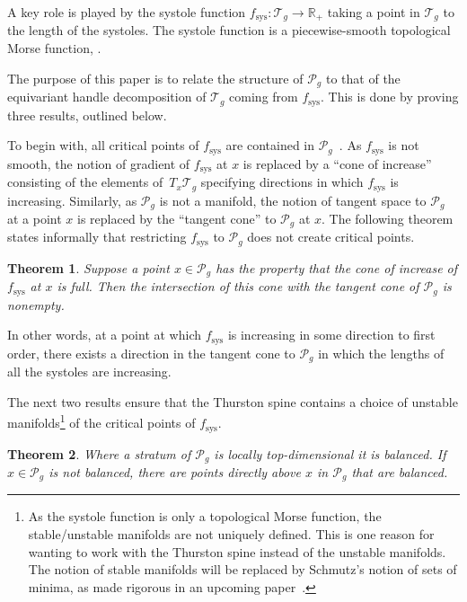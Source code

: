\documentclass[pdftex]{sigma}
\numberwithin{equation}{section}
\newtheorem{Theorem}{Theorem}[section]
\begin{document}
A key role is played by the systole function $f_{\mathrm{sys}}\colon \mathcal{T}_{g}\rightarrow \mathbb{R}_{+}$ taking a point in $\mathcal{T}_{g}$ to the length of the systoles. The systole function is a piecewise-smooth topological Morse function, \cite{Akrout,SchmutzMorse}.

The purpose of this paper is to relate the structure of $\mathcal{P}_{g}$ to that of the equivariant handle decomposition of $\mathcal{T}_{g}$ coming from $f_{\mathrm{sys}}$. This is done by proving three results, outlined below.

To begin with, all critical points of $f_{\mathrm{sys}}$ are contained in $\mathcal{P}_{g}$~\cite{Thurston}. As $f_{\mathrm{sys}}$ is not smooth, the notion of gradient of $f_{\mathrm{sys}}$ at $x$ is replaced by a ``cone of increase'' consisting of the elements of~$T_{x}\mathcal{T}_{g}$ specifying directions in which $f_{\mathrm{sys}}$ is increasing. Similarly, as $\mathcal{P}_{g}$ is not a manifold, the notion of tangent space to $\mathcal{P}_{g}$ at a point $x$ is replaced by the ``tangent cone'' to $\mathcal{P}_{g}$ at $x$. The following theorem states informally that restricting $f_{\mathrm{sys}}$ to $\mathcal{P}_{g}$ does not create critical points.

\begin{Theorem}
Suppose a point $x\in \mathcal{P}_{g}$ has the property that the cone of increase of $f_{\mathrm{sys}}$ at $x$ is full. Then the intersection of this cone with the tangent cone of $\mathcal{P}_{g}$ is nonempty.
\end{Theorem}

In other words, at a point at which $f_{\mathrm{sys}}$ is increasing in some direction to first order, there exists a direction in the tangent cone to $\mathcal{P}_{g}$ in which the lengths of all the systoles are increasing.

The next two results ensure that the Thurston spine contains a choice of unstable manifolds\footnote{As the systole function is only a topological Morse function, the stable/unstable manifolds are not uniquely defined. This is one reason for wanting to work with the Thurston spine instead of the unstable manifolds. The notion of stable manifolds will be replaced by Schmutz's notion of sets of minima, as made rigorous in an upcoming paper~\cite{STduality}.} of the critical points of $f_{\mathrm{sys}}$.

\begin{Theorem}
Where a stratum of $\mathcal{P}_{g}$ is locally top-dimensional it is balanced. If $x\in \mathcal{P}_{g}$ is not balanced, there are points directly above $x$ in $\mathcal{P}_{g}$ that are balanced.
\end{Theorem}
\end{document}
